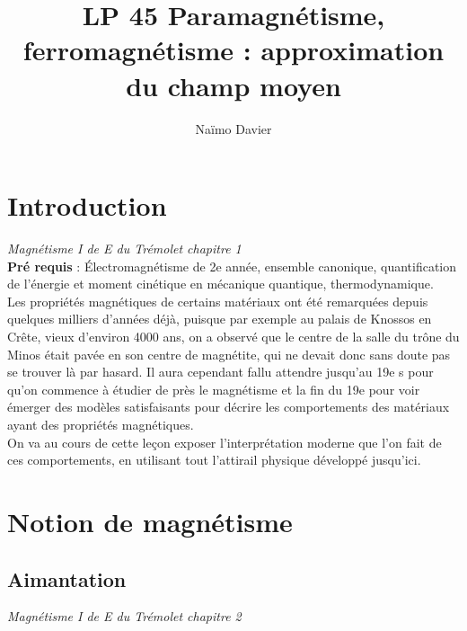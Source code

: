 \documentclass[12pt,prb,aps,epsf]{article}
\begin{document}
	
	\title{LP 45 Paramagnétisme, ferromagnétisme : approximation du champ moyen}
	\author{Naïmo Davier}
	
	\maketitle
	
	\tableofcontents
	
	\pagebreak
	
	
\section{Introduction}
\textit{Magnétisme I de E du Trémolet chapitre 1}\\
\textbf{Pré requis} : Électromagnétisme de 2e année, ensemble canonique, quantification de l'énergie et moment cinétique en mécanique quantique, thermodynamique.\\

Les propriétés magnétiques de certains matériaux ont été remarquées depuis quelques milliers d'années déjà, puisque par exemple au palais de Knossos en Crête, vieux d'environ 4000 ans, on a observé que le centre de la salle du trône du Minos était pavée en son centre de magnétite, qui ne devait donc sans doute pas se trouver là par hasard. Il aura cependant fallu attendre jusqu'au 19e s pour qu'on commence à étudier de près le magnétisme et la fin du 19e pour voir émerger des modèles satisfaisants pour décrire les comportements des matériaux ayant des propriétés magnétiques.\\
On va au cours de cette leçon exposer l'interprétation moderne que l'on fait de ces comportements, en utilisant tout l'attirail physique développé jusqu'ici.

\section{Notion de magnétisme}
\subsection{Aimantation}
\textit{Magnétisme I de E du Trémolet chapitre 2}\\
\end{document}
